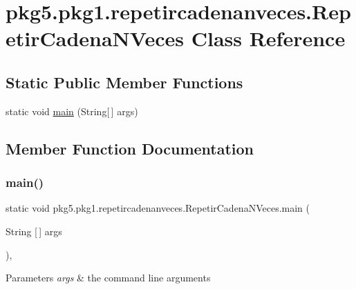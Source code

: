 \hypertarget{classpkg5_1_1pkg1_1_1repetircadenanveces_1_1_repetir_cadena_n_veces}{}\section{pkg5.\+pkg1.\+repetircadenanveces.\+Repetir\+Cadena\+N\+Veces Class Reference}
\label{classpkg5_1_1pkg1_1_1repetircadenanveces_1_1_repetir_cadena_n_veces}
\subsection*{Static Public Member Functions}
\begin{DoxyCompactItemize}
\item 
static void \mbox{\hyperlink{classpkg5_1_1pkg1_1_1repetircadenanveces_1_1_repetir_cadena_n_veces_acc7444a73cb09f644026a8afcee5b33f}{main}} (String\mbox{[}$\,$\mbox{]} args)
\end{DoxyCompactItemize}


\subsection{Member Function Documentation}
\mbox{\label{classpkg5_1_1pkg1_1_1repetircadenanveces_1_1_repetir_cadena_n_veces_acc7444a73cb09f644026a8afcee5b33f}} 
\subsubsection{\texorpdfstring{main()}{main()}}
{\footnotesize\ttfamily static void pkg5.\+pkg1.\+repetircadenanveces.\+Repetir\+Cadena\+N\+Veces.\+main (\begin{DoxyParamCaption}\item[{String \mbox{[}$\,$\mbox{]}}]{args }\end{DoxyParamCaption})\hspace{0.3cm}{\ttfamily [inline]}, {\ttfamily [static]}}


\begin{DoxyParams}{Parameters}
{\em args} & the command line arguments \\
\hline
\end{DoxyParams}

